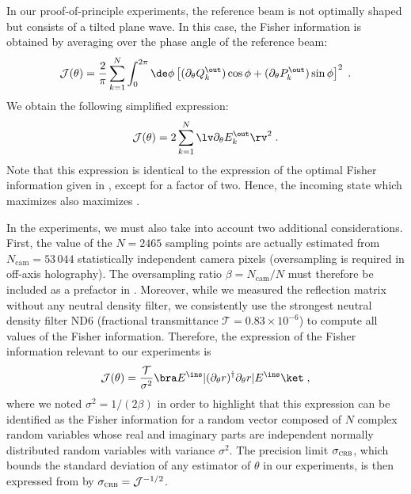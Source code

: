 \documentclass[aps,pra,twocolumn,amsmath,amssymb,superscriptaddress,10pt,nobibnotes]{revtex4-2}
\begin{document}
In our proof-of-principle experiments, the reference beam is not optimally shaped but consists of a tilted plane wave. In this case, the Fisher information is obtained by averaging  over the phase angle of the reference beam:
\begin{equation}
\mathcal{J}(\theta)= \frac{2}{\pi} \sum_{k=1}^N  \int_0^{2\pi} \de \phi \left[ (\partial_\theta Q_k^\out) \cos \phi + (\partial_\theta P_k^\out) \sin \phi\right]^2 \; .
\end{equation}
We obtain the following simplified expression:
\begin{equation}
\mathcal{J}(\theta)= 2 \sum_{k=1}^N \lv \partial_\theta E^\out_k \rv^2 \; .
\label{fisher_mean_ref}
\end{equation}
Note that this expression is identical to the expression of the optimal Fisher information given in , except for a factor of two. Hence, the incoming state which maximizes  also maximizes .

In the experiments, we must also take into account two additional considerations. First, the value of the $N=2465$ sampling points are actually estimated from $N_\mathrm{cam}=53\,044$ statistically independent camera pixels (oversampling is required in off-axis holography). The oversampling ratio $\beta=N_\mathrm{cam}/N$ must therefore be included as a prefactor in . Moreover, while we measured the reflection matrix without any neutral density filter, we consistently use the strongest neutral density filter ND6 (fractional transmittance $\mathcal{T}=0.83 \times 10^{-6}$) to compute all values of the Fisher information. Therefore, the expression of the Fisher information relevant to our experiments is 
\begin{equation}
\mathcal{J}(\theta)= \frac{\mathcal{T}}{\sigma^2} \bra E^\ins | (\partial_\theta r) ^\dagger \partial_\theta r | E^\ins \ket \; ,
\label{Fisher_exp}
\end{equation}
where we noted $\sigma^2=1/(2\beta)$ in order to highlight that this expression can be identified as the Fisher information for a random vector composed of $N$ complex random variables whose real and imaginary parts are independent normally distributed random variables with variance $\sigma^2$. The precision limit $\sigma_{\textsc{crb}}$, which bounds the standard deviation of any estimator of $\theta$ in our experiments, is then expressed from  by $\sigma_{\textsc{crb}}=\mathcal{J}^{-1/2}$. 
\end{document}
